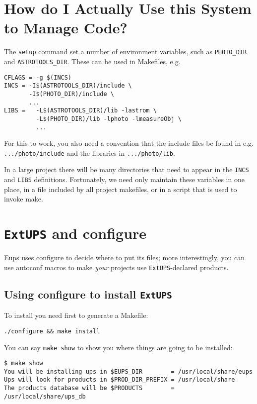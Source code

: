 \documentclass{article}
\newcommand{\code}[1]{\texttt{#1}}
\newcommand{\eups}{\code{ExtUPS}}
\begin{document}
\section{How do I Actually Use this System to Manage Code?}

The \code{setup} command set a number of environment variables,
such as \code{PHOTO\_DIR} and \code{ASTROTOOLS\_DIR}. These can
be used in Makefiles, e.g.
\begin{verbatim}
CFLAGS = -g $(INCS)
INCS = -I$(ASTROTOOLS_DIR)/include \
       -I$(PHOTO_DIR)/include \
       ...
LIBS =   -L$(ASTROTOOLS_DIR)/lib -lastrom \
         -L$(PHOTO_DIR)/lib -lphoto -lmeasureObj \
         ...
\end{verbatim}
For this to work, you also need a convention that the include
files be found in e.g. \code{.../photo/include} and the
libraries in \code{.../photo/lib}.

In a large project there will be many directories that need to appear
in the \code{INCS} and \code{LIBS} definitions.  Fortunately, we need
only maintain these variables in one place, in a file included by all
project makefiles, or in a script that is used to invoke make.

\section{\eups{} and configure}

Eups uses configure to decide where to put its files; more interestingly,
you can use autoconf macros to make \emph{your} projects use \eups{}-declared
products.

\subsection{Using configure to install \eups{}}

To install you need first to generate a Makefile:
\begin{verbatim}
./configure && make install
\end{verbatim}

You can say \texttt{make show} to show you where things are
going to be installed:
\begin{verbatim}
$ make show
You will be installing ups in $EUPS_DIR        = /usr/local/share/eups
Ups will look for products in $PROD_DIR_PREFIX = /usr/local/share
The products database will be $PRODUCTS        = /usr/local/share/ups_db
\end{verbatim}
\end{document}
